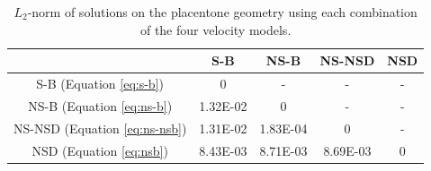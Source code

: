     \begin{table}[]
        \centering
        \begin{tabular}{c|cccc}
              & S-B & NS-B & NS-NSD & NSD \\
             \hline
             S-B (Equation \eqref{eq:s-b}) & \num{0} & - & - & - \\
             NS-B (Equation \eqref{eq:ns-b}) & \num{1.32E-02} & \num{0} & - & - \\
             NS-NSD (Equation \eqref{eq:ns-nsb}) & \num{1.31E-02} & \num{1.83E-04} & \num{0} & - \\
             NSD (Equation \eqref{eq:nsb}) & \num{8.43E-03} & \num{8.71E-03} & \num{8.69E-03} & \num{0} 
        \end{tabular}
        \caption{$L_2$-norm of solutions on the placentone geometry using each combination of the four velocity models.}
        \label{tab:4-models-placentone-l2}
    \end{table}